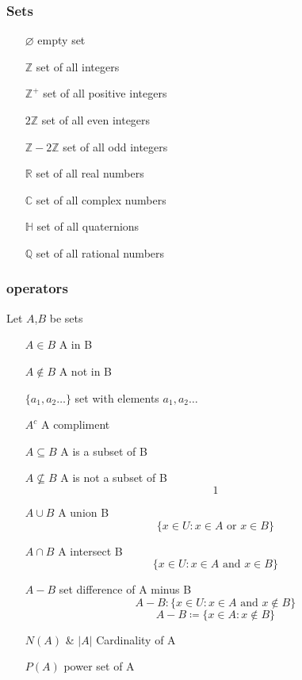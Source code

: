 \documentclass[12pt]{book}
\begin{document}
    \subsubsection{Sets}
        \begin{enumerate}
            \item[$\varnothing$] empty set
            \item[$\mathbb{Z}$] set of all integers
            \item[$\mathbb{Z}^+$] set of all positive integers
            \item[$2\mathbb{Z}$] set of all even integers
            \item[$\mathbb{Z} - 2\mathbb{Z}$] set of all odd integers
            \item[$\mathbb{R}$] set of all real numbers
            \item[$\mathbb{C}$] set of all complex numbers
            \item[$\mathbb{H}$] set of all quaternions
            \item[$\mathbb{Q}$] set of all rational numbers
        \end{enumerate}
    \subsubsection{operators}
    Let $A$,$B$ be sets
        \begin{enumerate}
            \item[$A\in B$] A in B
            \item[$A\notin B$] A not in B
            \item[$\{a_1,a_2\ldots\}$] set with elements $a_1,a_2\ldots$
            \item[$A^c$] A compliment
            \item[$A \subseteq B$] A is a subset of B
            \item[$A \not\subseteq B$] A is not a subset of B
                \[
                1
                \]
            \item[$A \cup B$] A union B
                \[
                \{x\in U: x\in A \text{ or } x \in B\}
                \]
            \item[$A \cap B$] A intersect B
                \[
                \{x\in U: x\in A \text{ and } x \in B\}
                \]
            \item[$A - B$] set difference of A minus B\\
                \[
                A - B: \{ x \in U: x\in A \text{ and } x \notin B\}
                \]
                \[
                A - B \coloneqq \{x\in A: x\notin B\}
                \]
            \item[$N(A)$ \& $|A|$] Cardinality of A
            \item[$P(A)$] power set of A
        \end{enumerate}
        
\end{document}
